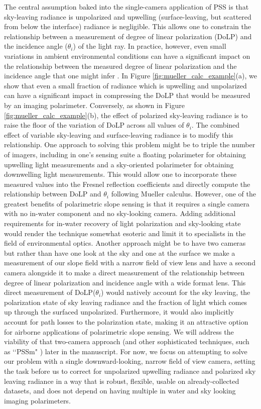 \documentclass[letterpaper,journal]{IEEEtran}
\begin{document}
The central assumption baked into the single-camera application of PSS is that sky-leaving radiance is unpolarized and upwelling (surface-leaving, but scattered from below the interface) radiance is negligible. This allows one to constrain the relationship between a measurement of degree of linear polarization (DoLP) and the incidence angle ($\theta_i$) of the light ray. In practice, however, even small variations in ambient environmental conditions can have a significant impact on the relationship between the measured degree of linear polarization and the incidence angle that one might infer \cite{goldstein_polarized_2017,voss_polarized_1997}. In Figure \ref{fig:mueller_calc_example}(a), we show that even a small fraction of radiance which is upwelling and unpolarized can have a significant impact in compressing the DoLP that would be measured by an imaging polarimeter. Conversely, as shown in Figure \ref{fig:mueller_calc_example}(b), the effect of polarized sky-leaving radiance is to raise the floor of the variation of DoLP across all values of $\theta_i$. The combined effect of variable sky-leaving and surface-leaving radiance is to modify this relationship. One approach to solving this problem might be to triple the number of imagers, including in one's sensing suite a floating polarimeter for obtaining upwelling light measurements and a sky-oriented polarimeter for obtaining downwelling light measurements. This would allow one to incorporate these measured values into the Fresnel reflection coefficients and directly compute the relationship between DoLP and $\theta_i$ following Mueller calculus. However, one of the greatest benefits of polarimetric slope sensing is that it requires a single camera with no in-water component and no sky-looking camera. Adding additional requirements for in-water recovery of light polarization and sky-looking state would render the technique somewhat esoteric and limit it to specialists in the field of environmental optics. Another approach might be to have two cameras but rather than have one look at the sky and one at the surface we make a measurement of our slope field with a narrow field of view lens and have a second camera alongside it to make a direct measurement of the relationship between degree of linear polarization and incidence angle with a wide format lens. This direct measurement of DoLP($\theta_i$) would natively account for the sky leaving, the polarization state of sky leaving radiance and the fraction of light which comes up through the surfaced unpolarized. Furthermore, it would also implicitly account for path losses to the polarization state, making it an attractive option for airborne applications of polarimetric slope sensing. We will address the viability of that two-camera approach (and other sophisticated techniques, such as \lq\lq PSSm" \cite{malinowski_surface_2024}) later in the manuscript. For now, we focus on attempting to solve our problem with a single downward-looking, narrow field of view camera, setting the task before us to correct for unpolarized upwelling radiance and polarized sky leaving radiance in a way that is robust, flexible, usable on already-collected datasets, and does not depend on having multiple in water and sky looking imaging polarimeters.
\end{document}
